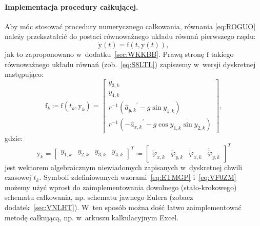 \documentclass[paper=a4,DIV=12]{lpas}
\newcommand{\brm}[1]{\bm{\mathrm{#1}}}
\begin{document}
\paragraph{Implementacja procedury całkującej.}
Aby móc stosować procedury numerycznego całkowania, równania \eqref{eq:ROGUO}
należy przekształcić do postaci równoważnego układu równań pierwszego rzędu:
\begin{equation}
  \dot{\brm{y}}\left(t\right) = \brm{f}\left(t,\brm{y}\left(t\right)\right),
  \label{eq:DOHJE}
\end{equation}
jak to zaproponowano w~dodatku~\ref{sec:WKKBB}. Prawą stronę $\brm{f}$
takiego równoważnego układu równań (zob.~\eqref{eq:S8LTL}) zapiszemy w~wersji
dyskretnej następująco:
\begin{equation}
  \brm{f}_k \coloneqq \brm{f}\left(t_k, \brm{y}_k\right) = \begin{bmatrix}
    y_{3,k} \\
    y_{4,k} \\
    r^{-1} \left( {\hat{a}_{y,k}}^{\prime} - g \sin{y_{1,k}} \right)  \\
    r^{-1} \left(-{\hat{a}_{x,k}}^{\prime} - g \cos{y_{1,k}}\sin{y_{2,k}} \right)
  \end{bmatrix},
  \label{eq:ETMGP}
\end{equation}
gdzie:
\begin{equation}
  \brm{y}_k = \begin{bmatrix}
    y_{1,k} & y_{2,k} & y_{3,k} & y_{4,k}
  \end{bmatrix}^T \coloneqq \begin{bmatrix}
    \widetilde{\varphi}_{x,k} &
    \widetilde{\varphi}_{y,k} &
    \dot{\widetilde{\varphi}}_{x,k} &
    \dot{\widetilde{\varphi}}_{y,k}
  \end{bmatrix}^T
  \label{eq:VF0ZM}
\end{equation}
jest wektorem algebraicznym niewiadomych zapisanych w~dyskretnej chwili
czasowej $t_k$. Symboli zdefiniowanych wzorami~\eqref{eq:ETMGP}
i~\eqref{eq:VF0ZM} możemy użyć wprost do zaimplementowania dowolnego
(stało-krokowego) schematu całkowania, np. schematu jawnego Eulera (zobacz
dodatek~\ref{sec:VNLHT}). W~ten sposób można dość łatwo zaimplementować metodę
całkującą, np. w~arkuszu kalkulacyjnym Excel.
\end{document}
